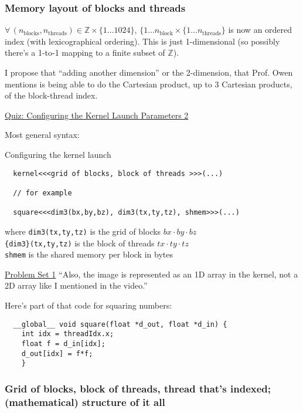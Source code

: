\documentclass[10pt]{amsart}
\begin{document}
\begin{multicols*}{2}
\subsubsection{Memory layout of blocks and threads}

$\forall \, (n_{\text{blocks}}, n_{\text{threads}}) \in \mathbb{Z} \times \lbrace 1 \dots 1024 \rbrace$, $\lbrace 1 \dots n_{\text{block}} \times \lbrace 1 \dots n_{\text{threads}} \rbrace$ is now an ordered index (with lexicographical ordering).  This is just 1-dimensional (so possibly there's a 1-to-1 mapping to a finite subset of $\mathbb{Z}$).

I propose that ``adding another dimension'' or the 2-dimension, that Prof. Owen mentions is being able to do the Cartesian product, up to 3 Cartesian products, of the block-thread index.  

\href{https://classroom.udacity.com/courses/cs344/lessons/55120467/concepts/668398860923}{Quiz: Configuring the Kernel Launch Parameters 2 }

Most general syntax:

Configuring the kernel launch
\begin{lstlisting}
  kernel<<<grid of blocks, block of threads >>>(...)

  // for example

  square<<<dim3(bx,by,bz), dim3(tx,ty,tz), shmem>>>(...)
  \end{lstlisting}
where \verb|dim3(tx,ty,tz)| is the grid of blocks $bx\cdot by \cdot bz$ \\
\phantom{ where } \verb|{dim3}(tx,ty,tz)| is the block of threads $tx \cdot ty \cdot tz$ \\
\phantom{ where } \verb|shmem| is the shared memory per block in bytes


\href{https://classroom.udacity.com/courses/cs344/lessons/55120467/concepts/967066740923}{Problem Set 1}
``Also, the image is represented as an 1D array in the kernel, not a 2D array like I mentioned in the video.''

Here's part of that code for squaring numbers:
\begin{lstlisting}
  __global__ void square(float *d_out, float *d_in) {
    int idx = threadIdx.x;
    float f = d_in[idx];
    d_out[idx] = f*f;
    }
  \end{lstlisting}

\subsubsection{Grid of blocks, block of threads, thread that's indexed; (mathematical) structure of it all}


\end{multicols*}
\end{document}

